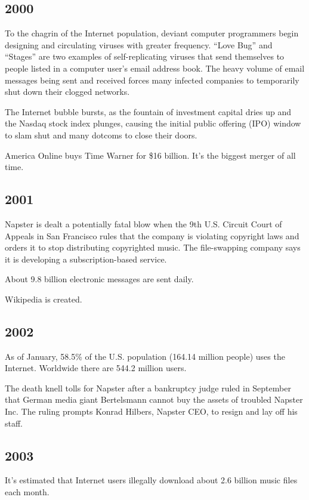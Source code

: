 \documentclass[letterpaper,12pt,english]{sphinxmanual}
\begin{document}
\subsection{2000}
\label{network-timeline:id19}
To the chagrin of the Internet population, deviant computer programmers begin designing and circulating viruses with greater frequency. “Love Bug” and “Stages” are two examples of self-replicating viruses that send themselves to people listed in a computer user's email address book. The heavy volume of email messages being sent and received forces many infected companies to temporarily shut down their clogged networks.

The Internet bubble bursts, as the fountain of investment capital dries up and the Nasdaq stock index plunges, causing the initial public offering (IPO) window to slam shut and many dotcoms to close their doors.

America Online buys Time Warner for \$16 billion. It’s the biggest merger of all time.


\subsection{2001}
\label{network-timeline:id20}
Napster is dealt a potentially fatal blow when the 9th U.S. Circuit Court of Appeals in San Francisco rules that the company is violating copyright laws and orders it to stop distributing copyrighted music. The file-swapping company says it is developing a subscription-based service.

About 9.8 billion electronic messages are sent daily.

Wikipedia is created.


\subsection{2002}
\label{network-timeline:id21}
As of January, 58.5\% of the U.S. population (164.14 million people) uses the Internet. Worldwide there are 544.2 million users.

The death knell tolls for Napster after a bankruptcy judge ruled in September that German media giant Bertelsmann cannot buy the assets of troubled Napster Inc. The ruling prompts Konrad Hilbers, Napster CEO, to resign and lay off his staff.


\subsection{2003}
\label{network-timeline:id22}
It's estimated that Internet users illegally download about 2.6 billion music files each month.
\end{document}
